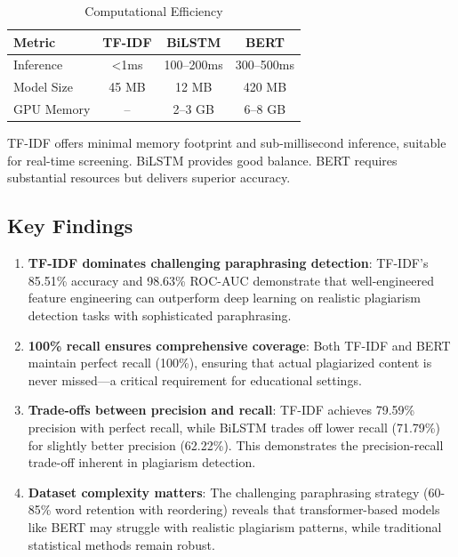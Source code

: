 \begin{table}[h!]
\centering
\caption{Computational Efficiency}
\label{tab:efficiency}
\begin{tabular}{|l|c|c|c|}
\hline
\textbf{Metric} & \textbf{TF-IDF} & \textbf{BiLSTM} & \textbf{BERT} \\
\hline
Inference & \textless 1ms & 100--200ms & 300--500ms \\
Model Size & 45 MB & 12 MB & 420 MB \\
GPU Memory & -- & 2--3 GB & 6--8 GB \\
\hline
\end{tabular}
\end{table}

TF-IDF offers minimal memory footprint and sub-millisecond inference, suitable for real-time screening. BiLSTM provides good balance. BERT requires substantial resources but delivers superior accuracy.

\subsection{Key Findings}

\begin{enumerate}
  \item \textbf{TF-IDF dominates challenging paraphrasing detection}: TF-IDF's 85.51\% accuracy and 98.63\% ROC-AUC demonstrate that well-engineered feature engineering can outperform deep learning on realistic plagiarism detection tasks with sophisticated paraphrasing.
  
  \item \textbf{100\% recall ensures comprehensive coverage}: Both TF-IDF and BERT maintain perfect recall (100\%), ensuring that actual plagiarized content is never missed—a critical requirement for educational settings.
  
  \item \textbf{Trade-offs between precision and recall}: TF-IDF achieves 79.59\% precision with perfect recall, while BiLSTM trades off lower recall (71.79\%) for slightly better precision (62.22\%). This demonstrates the precision-recall trade-off inherent in plagiarism detection.
  
  \item \textbf{Dataset complexity matters}: The challenging paraphrasing strategy (60-85\% word retention with reordering) reveals that transformer-based models like BERT may struggle with realistic plagiarism patterns, while traditional statistical methods remain robust.
\end{enumerate}
